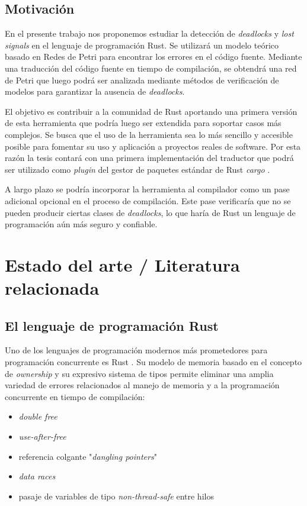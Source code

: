 \documentclass[12pt]{article}
\begin{document}
\subsection{Motivación}

En el presente trabajo nos proponemos estudiar la detección de \textit{deadlocks} y \textit{lost signals} en el lenguaje de programación Rust.
Se utilizará un modelo teórico basado en Redes de Petri para encontrar los errores en el código fuente. Mediante una traducción del código fuente
en tiempo de compilación, se obtendrá una red de Petri que luego podrá ser analizada mediante métodos de verificación de modelos para garantizar la ausencia de \textit{deadlocks}.

El objetivo es contribuir a la comunidad de Rust aportando una primera versión de esta herramienta que podría luego ser extendida para soportar casos más complejos.
Se busca que el uso de la herramienta sea lo más sencillo y accesible posible para fomentar su uso y aplicación a proyectos reales de software.
Por esta razón la tesis contará con una primera implementación del traductor que podrá ser utilizado como \textit{plugin}
del gestor de paquetes estándar de Rust \textit{cargo} \cite{cargo-website}.

A largo plazo se podría incorporar la herramienta al compilador como un pase adicional opcional en el proceso de compilación.
Este pase verificaría que no se pueden producir ciertas clases de \textit{deadlocks}, lo que haría de Rust un lenguaje de programación aún más seguro y confiable.

\bigskip

\section{Estado del arte / Literatura relacionada}

\subsection{El lenguaje de programación Rust}

Uno de los lenguajes de programación modernos más prometedores para programación concurrente es Rust \cite{rust-website}.
Su modelo de memoria basado en el concepto de \textit{ownership} y su expresivo sistema de tipos permite eliminar una amplia variedad de
errores relacionados al manejo de memoria y a la programación concurrente en tiempo de compilación:

\begin{itemize}
    \item \textit{double free} \cite[Cap. 4.1]{rust-book}
    \item \textit{use-after-free} \cite[Cap. 4.1]{rust-book}
    \item referencia colgante "\textit{dangling pointers}" \cite[Cap. 4.2]{rust-book}
    \item \textit{data races} \cite[Cap. 4.2]{rust-book}
    \item pasaje de variables de tipo \textit{non-thread-safe} entre hilos \cite[Cap. 16.4]{rust-book}
\end{itemize}
\end{document}
